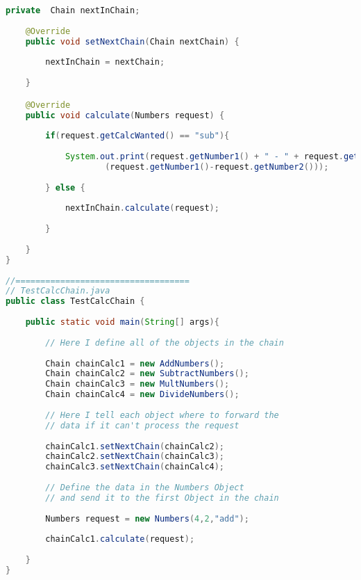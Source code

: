 \documentclass[10pt , a4paper]{article}
\begin{document}
\begin{lstlisting}[language=java]
	private  Chain nextInChain;
	
	@Override
	public void setNextChain(Chain nextChain) {
		
		nextInChain = nextChain;
		
	}

	@Override
	public void calculate(Numbers request) {
		
		if(request.getCalcWanted() == "sub"){
			
			System.out.print(request.getNumber1() + " - " + request.getNumber2() + " = "+
					(request.getNumber1()-request.getNumber2()));
			
		} else {
			
			nextInChain.calculate(request);
			
		}
		
	}
}
 
//===================================
// TestCalcChain.java
public class TestCalcChain {
	
	public static void main(String[] args){
		
		// Here I define all of the objects in the chain
		
		Chain chainCalc1 = new AddNumbers();
		Chain chainCalc2 = new SubtractNumbers();
		Chain chainCalc3 = new MultNumbers();
		Chain chainCalc4 = new DivideNumbers();
		
		// Here I tell each object where to forward the
		// data if it can't process the request
		
		chainCalc1.setNextChain(chainCalc2);
		chainCalc2.setNextChain(chainCalc3);
		chainCalc3.setNextChain(chainCalc4);
		
		// Define the data in the Numbers Object
		// and send it to the first Object in the chain
		
		Numbers request = new Numbers(4,2,"add");
		
		chainCalc1.calculate(request);
		
	}
}
 

\end{lstlisting}
\end{document}
